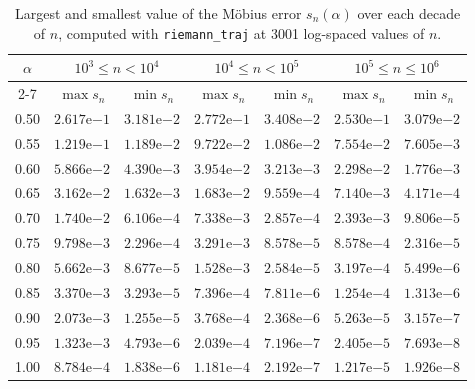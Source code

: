 \begin{table}[htb!]
\centering
\footnotesize
\begin{tabular}{|c|cc|cc|cc|}
\hline
\multirow{2}{*}{$\alpha$} & \multicolumn{2}{c|}{$10^{3} \leq n < 10^{4}$} & \multicolumn{2}{c|}{$10^{4} \leq n < 10^{5}$} & \multicolumn{2}{c|}{$10^{5} \leq n \leq 10^{6}$} \\
\cline{2-7}
 & $\max s_n$ & $\min s_n$ & $\max s_n$ & $\min s_n$ & $\max s_n$ & $\min s_n$ \\
\hline\hline
0.50 & $2.617\mathrm{e}{-1}$ & $3.181\mathrm{e}{-2}$ & $2.772\mathrm{e}{-1}$ & $3.408\mathrm{e}{-2}$ & $2.530\mathrm{e}{-1}$ & $3.079\mathrm{e}{-2}$ \\
0.55 & $1.219\mathrm{e}{-1}$ & $1.189\mathrm{e}{-2}$ & $9.722\mathrm{e}{-2}$ & $1.086\mathrm{e}{-2}$ & $7.554\mathrm{e}{-2}$ & $7.605\mathrm{e}{-3}$ \\
0.60 & $5.866\mathrm{e}{-2}$ & $4.390\mathrm{e}{-3}$ & $3.954\mathrm{e}{-2}$ & $3.213\mathrm{e}{-3}$ & $2.298\mathrm{e}{-2}$ & $1.776\mathrm{e}{-3}$ \\
0.65 & $3.162\mathrm{e}{-2}$ & $1.632\mathrm{e}{-3}$ & $1.683\mathrm{e}{-2}$ & $9.559\mathrm{e}{-4}$ & $7.140\mathrm{e}{-3}$ & $4.171\mathrm{e}{-4}$ \\
0.70 & $1.740\mathrm{e}{-2}$ & $6.106\mathrm{e}{-4}$ & $7.338\mathrm{e}{-3}$ & $2.857\mathrm{e}{-4}$ & $2.393\mathrm{e}{-3}$ & $9.806\mathrm{e}{-5}$ \\
0.75 & $9.798\mathrm{e}{-3}$ & $2.296\mathrm{e}{-4}$ & $3.291\mathrm{e}{-3}$ & $8.578\mathrm{e}{-5}$ & $8.578\mathrm{e}{-4}$ & $2.316\mathrm{e}{-5}$ \\
0.80 & $5.662\mathrm{e}{-3}$ & $8.677\mathrm{e}{-5}$ & $1.528\mathrm{e}{-3}$ & $2.584\mathrm{e}{-5}$ & $3.197\mathrm{e}{-4}$ & $5.499\mathrm{e}{-6}$ \\
0.85 & $3.370\mathrm{e}{-3}$ & $3.293\mathrm{e}{-5}$ & $7.396\mathrm{e}{-4}$ & $7.811\mathrm{e}{-6}$ & $1.254\mathrm{e}{-4}$ & $1.313\mathrm{e}{-6}$ \\
0.90 & $2.073\mathrm{e}{-3}$ & $1.255\mathrm{e}{-5}$ & $3.768\mathrm{e}{-4}$ & $2.368\mathrm{e}{-6}$ & $5.263\mathrm{e}{-5}$ & $3.157\mathrm{e}{-7}$ \\
0.95 & $1.323\mathrm{e}{-3}$ & $4.793\mathrm{e}{-6}$ & $2.039\mathrm{e}{-4}$ & $7.196\mathrm{e}{-7}$ & $2.405\mathrm{e}{-5}$ & $7.693\mathrm{e}{-8}$ \\
1.00 & $8.784\mathrm{e}{-4}$ & $1.838\mathrm{e}{-6}$ & $1.181\mathrm{e}{-4}$ & $2.192\mathrm{e}{-7}$ & $1.217\mathrm{e}{-5}$ & $1.926\mathrm{e}{-8}$ \\
\hline
\end{tabular}
\caption{Largest and smallest value of the M\"obius error $s_n(\alpha)$ over each decade of $n$, computed with \texttt{riemann\_traj} at 3001 log-spaced values of $n$.}
\label{tab:envelope}
\end{table}
